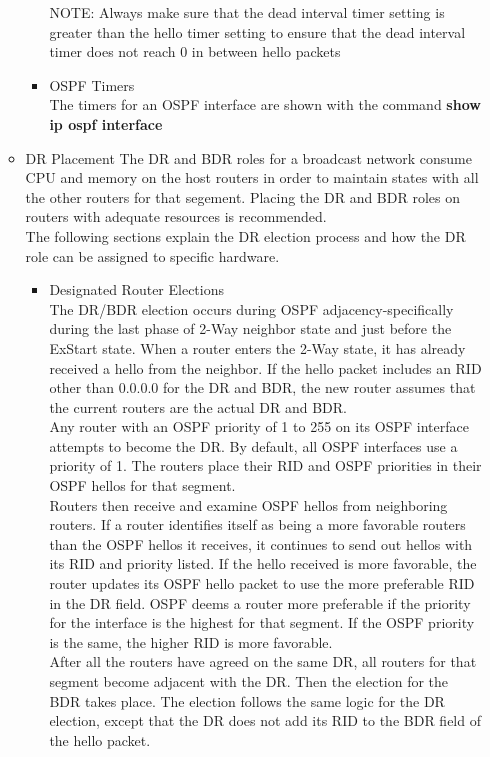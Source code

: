 \documentclass{article}
\begin{document}
\begin{itemize}
\begin{itemize}
\begin{itemize}
					NOTE: Always make sure that the dead interval timer setting is greater than the hello timer setting to ensure that the dead interval timer does not reach 0 in between hello packets

					\item OSPF Timers\\
						The timers for an OSPF interface are shown with the command \textbf{show ip ospf interface}
				\end{itemize}

			\item DR Placement
				The DR and BDR roles for a broadcast network consume CPU and memory on the host routers in order to maintain states with all the other routers for that segement. Placing the DR and BDR roles on routers with adequate resources is recommended.\\

				The following sections explain the DR election process and how the DR role can be assigned to specific hardware.
				\begin{itemize}
					\item Designated Router Elections\\
						The DR/BDR election occurs during OSPF adjacency-specifically during the last phase of 2-Way neighbor state and just before the ExStart state. When a router enters the 2-Way state, it has already received a hello from the neighbor. If the hello packet includes an RID other than 0.0.0.0 for the DR and BDR, the new router assumes that the current routers are the actual DR and BDR.\\
						Any router with an OSPF priority of 1 to 255 on its OSPF interface attempts to become the DR. By default, all OSPF interfaces use a priority of 1. The routers place their RID and OSPF priorities in their OSPF hellos for that segment.\\

						Routers then receive and examine OSPF hellos from neighboring routers. If a router identifies itself as being a more favorable routers than the OSPF hellos it receives, it continues to send out hellos with its RID and priority listed. If the hello received is more favorable, the router updates its OSPF hello packet to use the more preferable RID in the DR field. OSPF deems a router more preferable if the priority for the interface is the highest for that segment. If the OSPF priority is the same, the higher RID is more favorable.\\

						After all the routers have agreed on the same DR, all routers for that segment become adjacent with the DR. Then the election for the BDR takes place. The election follows the same logic for the DR election, except that the DR does not add its RID to the BDR field of the hello packet.\\


\end{itemize}
\end{itemize}
\end{itemize}
\end{document}
